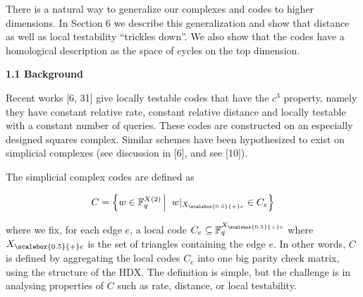 


There is a natural way to generalize our complexes and codes to higher dimensions. In Section 6 we describe this generalization and show that distance as well as local testability “trickles down”. We also show that the codes have a homological description as the space of cycles on the top dimension.\par




\par\medskip\noindent\textbf{
1.1 Background}\par




Recent works [6, 31] give locally testable codes that have the $c^{3}$ property, namely they have constant relative rate, constant relative distance and locally testable with a constant number of queries. These codes are constructed on an especially designed squares complex. Similar schemes have been hypothesized to exist on simplicial complexes (see discussion in [6], and see [10]).\par




The simplicial complex codes are defined as\par


\[\begin{gathered}
C=\left\{w\in\mathbb{F}_{q}^{X(2)}\left|\;\vphantom{w\in\mathbb{F}_{q}^{X(2)}w|_{{X}_{\scalebox{0.5}{+}e}}\in C_{e}}\right.w|_{{X}_{\scalebox{0.5}{+}e}}\in C_{e}\right\}
\end{gathered}\]


where we fix, for each edge $e$, a local code $C_{e}\subseteq\mathbb{F}_{q}^{{X}_{\scalebox{0.5}{+}e}}$ where ${X}_{\scalebox{0.5}{+}e}$ is the set of triangles containing the edge $e$. In other words, $C$ is defined by aggregating the local codes $C_{e}$ into one big parity check matrix, using the structure of the HDX. The definition is simple, but the challenge is in analysing properties of $C$ such as rate, distance, or local testability.\par


